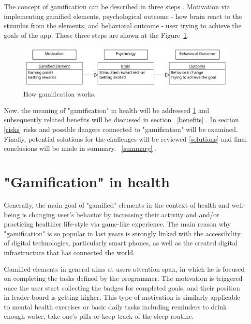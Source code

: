 \documentclass[10pt,twoside,english,a4paper]{article}
\begin{document}
The concept of gamification can be described in three steps \cite{6758978}. Motivation via implementing gamified elements, psychological outcome - how brain react to the stimulus from the elements, and behavioral outcome - user trying to achieve the goals of the app. These three steps are shown at the Figure~\ref{f:figure1}.

\begin{figure}[tbh]
\centering
\includegraphics[width=1.0\linewidth]{Figure1.pdf}
\caption{How gamification works.}
\label{f:figure1}
\end{figure}


Now, the meaning of "gamification" in health will be addressed \ref{G-i-H} and subsequently related benefits will be discussed in section ~\ref{benefits} . In section \ref{risks} risks and possible dangers connected to "gamification" will be examined. Finally, potential solutions for the challenges will be reviewed \ref{solutions} and final conclusions will be made  in summary. ~\ref{summary} .

%
%
%

\section{"Gamification" in health} \label{G-i-H}
Generally, the main goal of "gamified" elements in the context of health and well-being is changing user's behavior by increasing their activity and and/or practicing healthier life-style via game-like experience. The main reason why "gamification" is so popular in last years is strongly linked with the accessibility of digital technologies, particularly smart phones, as well as the created digital infrastructure\cite{Ethics} that has connected the world. 

Gamified elements in general aims at users attention span, in which he is focused on completing the tasks defined by the programmer. The motivation is triggered once the user start collecting the badges for completed goals, and their position in leader-board is getting higher. This type of motivation is similarly applicable to mental health exercises or basic daily tasks including reminders to drink enough water, take one's pills or keep track of the sleep routine. 
\end{document}
